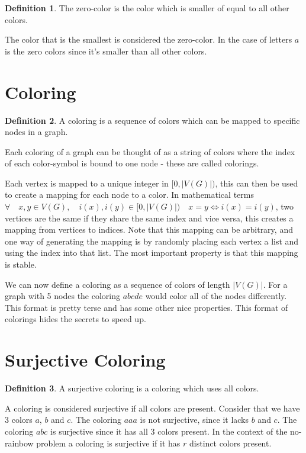 \documentclass{book}
\theoremstyle{definition}
\newtheorem{definition}{Definition}[section]
\begin{document}
\begin{definition}
  The zero-color is the color which is smaller of equal to all other colors.
\end{definition}
The color that is the smallest is considered the zero-color. In the case of letters $a$ is the zero colors since it's smaller than all other colors.

\section{Coloring}
\begin{definition}
  A coloring is a sequence of colors which can be mapped to specific nodes in a graph.
\end{definition}
Each coloring of a graph can be thought of as a string of colors where the index of each color-symbol is bound to one node - these are called colorings.

Each vertex is mapped to a unique integer in $[0, |V(G)|)$, this can then be used to create a mapping for each node to a color. In mathematical terms $\forall \quad x, y \in V(G), \quad i(x), i(y) \in [0, |V(G)|) \quad x = y \iff i(x) = i(y)$, two vertices are the same if they share the same index and vice versa, this creates a mapping from vertices to indices. Note that this mapping can be arbitrary, and one way of generating the mapping is by randomly placing each vertex a list and using the index into that list. The most important property is that this mapping is stable.

We can now define a coloring as a sequence of colors of length $|V(G)|$. For a graph with 5 nodes the coloring $abcde$ would color all of the nodes differently. This format is pretty terse and has some other nice properties. This format of colorings hides the secrets to speed up.

\section{Surjective Coloring}
\begin{definition}
  A surjective coloring is a coloring which uses all colors.
\end{definition}
A coloring is considered surjective if all colors are present. Consider that we have 3 colors $a$, $b$ and $c$. The coloring $aaa$ is not surjective, since it lacks $b$ and $c$. The coloring $abc$ is surjective since it has all 3 colors present. In the context of the no-rainbow problem a coloring is surjective if it has $r$ distinct colors present.
\end{document}
